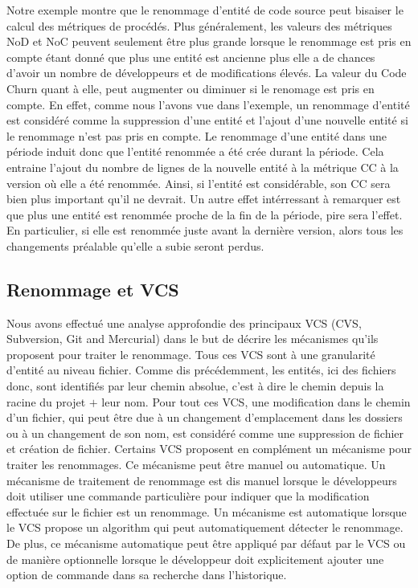Notre exemple montre que le renommage d'entité de code source peut bisaiser le calcul des métriques de procédés. Plus généralement, les valeurs des métriques NoD et NoC peuvent seulement être plus grande lorsque le renommage est pris en compte étant donné que plus une entité est ancienne plus elle a de chances d'avoir un nombre de développeurs et de modifications élevés. La valeur du Code Churn quant à elle, peut augmenter ou diminuer si le renomage est pris en compte. En effet, comme nous l'avons vue dans l'exemple, un renommage d'entité est considéré comme la suppression d'une entité et l'ajout d'une nouvelle entité si le renommage n'est pas pris en compte. Le renommage d'une entité dans une période induit donc que l'entité renommée a été crée durant la période. Cela entraine l'ajout du nombre de lignes de la nouvelle entité à la métrique CC à la version où elle a été renommée. Ainsi, si l'entité est considérable, son CC sera bien plus important qu'il ne devrait. Un autre effet intérressant à remarquer est que plus une entité est renommée proche de la fin de la période, pire sera l'effet. En particulier, si elle est renommée juste avant la dernière version, alors tous les changements préalable qu'elle a subie seront perdus.\\

\subsection{Renommage et VCS}

Nous avons effectué une analyse approfondie des principaux VCS (CVS, Subversion, Git and Mercurial) dans le but de décrire les mécanismes qu'ils proposent pour traiter le renommage. Tous ces VCS sont à une granularité d'entité au niveau fichier. Comme dis précédemment, les entités, ici des fichiers donc, sont identifiés par leur chemin absolue, c'est à dire le chemin depuis la racine du projet $+$ leur nom. Pour tout ces VCS, une modification dans le chemin d'un fichier, qui peut être due à un changement d'emplacement dans les dossiers ou à un changement de son nom, est considéré comme une suppression de fichier et création de fichier. Certains VCS proposent en complément un mécanisme pour traiter les renommages. Ce mécanisme peut être manuel ou automatique. Un mécanisme de traitement de renommage est dis manuel lorsque le développeurs doit utiliser une commande particulière pour indiquer que la modification effectuée sur le fichier est un renommage. Un mécanisme est automatique lorsque le VCS propose un algorithm qui peut automatiquement détecter le renommage. De plus, ce mécanisme automatique peut être appliqué par défaut par le VCS ou de manière optionnelle lorsque le développeur doit explicitement ajouter une option de commande dans sa recherche dans l'historique.\\
 
